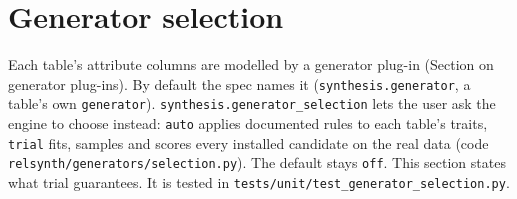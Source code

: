 \section{Generator selection}\label{sec:v73selection}
\setcounter{savedpropselect}{\value{proposition}}
Each table's attribute columns are modelled by a generator plug-in (Section on generator plug-ins). By default the spec names it (\texttt{synthesis.generator}, a table's own \texttt{generator}). \texttt{synthesis.generator\_selection} lets the user ask the engine to choose instead: \texttt{auto} applies documented rules to each table's traits, \texttt{trial} fits, samples and scores every installed candidate on the real data (code \texttt{relsynth/generators/selection.py}). The default stays \texttt{off}. This section states what trial guarantees. It is tested in \texttt{tests/unit/test\_generator\_selection.py}.

